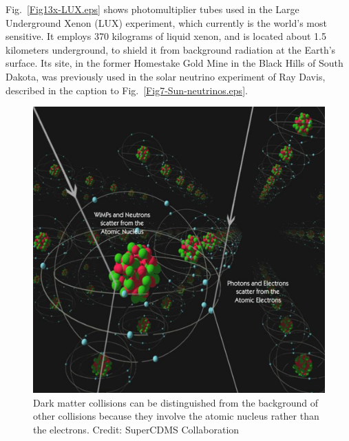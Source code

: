 \documentclass[12pt]{iopart}
\begin{document}
Fig.~\ref{Fig13x-LUX.eps} shows photomultiplier tubes used in the Large Underground Xenon (LUX) experiment, which currently is the world's most sensitive. It employs 370 kilograms of liquid xenon, and is located about 1.5 kilometers underground, to shield it from background radiation at the Earth's surface. Its site, in the former Homestake Gold Mine in the Black Hills of South Dakota, was previously used in the solar neutrino experiment of Ray Davis, described in the caption to Fig.~\ref{Fig7-Sun-neutrinos.eps}.
\begin{figure}[htbp]
\centering
\includegraphics[bb=0 0 360 360, width=5in]{Fig13a-CDMS.eps}
\caption{Dark matter collisions can be distinguished from the background of other collisions because they involve the atomic nucleus rather than the electrons. Credit: SuperCDMS Collaboration \label{Fig13a-CDMS.eps}}
\end{figure}
\end{document}
